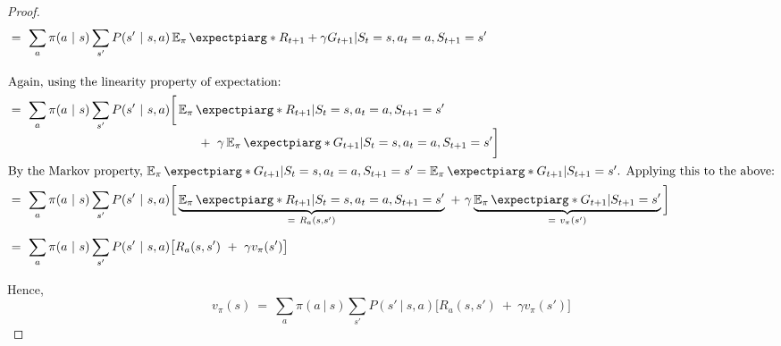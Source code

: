 \documentclass[twoside,11pt]{homework}
\DeclarePairedDelimiter{\2norm}{\lVert}{\rVert^2_2}
\newcommand{\1}[1]{\mathds{1}\left[#1\right]}
\newcommand{\expectpi}{\operatorname{\mathbb{E}_{\pi}}\expectpiarg}
\begin{document}
\begin{proof}
\begin{align*}
& = \ \sum_{a} \pi(a \ | \ s)\sum_{s'} P(s' \ | \ s, a)\expectpi*{  R_{t+1} + \gamma G_{t+1}  |  S_t = s, a_t = a, S_{t+1} = s'}\\[1em]
\intertext{Again, using the linearity property of expectation:}
& = \ \sum_{a} \pi(a \ | \ s)\sum_{s'} P(s' \ | \ s, a)\bigg[\expectpi*{  R_{t+1} |  S_t = s, a_t = a, S_{t+1} = s'}  \\[-0.5em]
&\quad \ \ \ \ \ \ \ \ \ \ \ \ \ \ \ \ \ \ \ \ \ \ \ \ \ \ \ \ \ \ \ \ \ \ \ \ \ \ \ \ \ \ \ + \ \gamma\expectpi*{G_{t+1} | S_t = s, a_t = a, S_{t+1} = s'}\bigg] \\
\intertext{By the Markov property, $\expectpi*{G_{t+1} | S_t = s, a_t = a, S_{t+1} = s'} =  \expectpi*{G_{t+1} | S_{t+1} = s'}$. Applying this to the above:}
& = \ \sum_{a} \pi(a \ | \ s)\sum_{s'} P(s' \ | \ s, a)\bigg[\underbrace{\expectpi*{  R_{t+1} |  S_t = s, a_t = a, S_{t+1} = s'}}_{= \ R_a(s, s')}  \ + \ \gamma\underbrace{\expectpi*{G_{t+1} | S_{t+1} = s'}}_{= \ v_{\pi}(s')}\bigg] \\[0.5em]
& = \ \sum_{a} \pi(a \ | \ s)\sum_{s'} P(s' \ | \ s, a)\big[R_a(s, s') \ + \ \gamma v_{\pi}(s') \big] \\[0.5em]
\end{align*}
Hence, $$v_{\pi}(s) \ = \ \sum_{a} \pi(a \ | \ s)\sum_{s'} P(s' \ | \ s, a)\big[R_a(s, s') \ + \ \gamma v_{\pi}(s') \big]$$
\end{proof}
\end{document}
